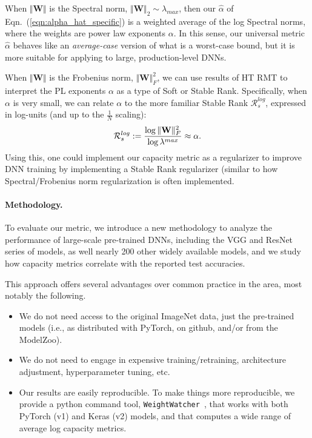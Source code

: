 When $\Vert\mathbf{W}\Vert$ is the Spectral norm, $\Vert\mathbf{W}\Vert_{2}\sim\lambda_{max}$, then our $\hat{\alpha}$ of Eqn.~(\ref{eqn:alpha_hat_specific}) is a weighted average of the log Spectral norms, where the weights are power law exponents $\alpha$. 
In this sense, our universal metric $\hat{\alpha}$ behaves like an \emph{average-case} version of what is a worst-case bound, but it is more suitable for applying to large, production-level DNNs.
 
When $\Vert\mathbf{W}\Vert$ is the Frobenius norm, $\Vert\mathbf{W}\Vert^{2}_{F}$, we can use results of HT RMT to interpret the PL exponents $\alpha$ as a type of Soft or Stable Rank. 
Specifically, when $\alpha$ is very small, we can relate $\alpha$ to the more familiar Stable Rank $\mathcal{R}^{log}_{s}$, expressed in log-units (and up to the $\frac{1}{N}$ scaling):
\vspace{-2mm}
\begin{equation}
\mathcal{R}^{log}_{s}:=\dfrac{\log\Vert\mathbf{W}\Vert^{2}_{F}}{\log\lambda^{max}}  \approx \alpha  .
\vspace{-1mm}
\end{equation}
Using this, one could implement our capacity metric as a regularizer to improve DNN training by implementing a Stable Rank regularizer (similar to how Spectral/Frobenius norm regularization is often implemented.  %


\vspace{-2mm}
\paragraph{Methodology.} 
To evaluate our metric, we introduce a new methodology to analyze the performance of large-scale pre-trained DNNs, including the VGG and ResNet series of models, as well nearly 200 other widely available models, and we study how capacity metrics correlate with the reported test accuracies.
 
This approach offers several advantages over common practice in the area, most notably the following.
\begin{itemize}
\item 
We do not need access to the original ImageNet data, just the pre-trained models (i.e., as distributed with PyTorch, on github, and/or from the ModelZoo).
\item
We do not need to engage in expensive training/retraining, architecture adjustment, hyperparameter tuning, etc.
\item 
Our results are easily reproducible.
To make things more reproducible, we provide a python command tool, \texttt{WeightWatcher}~\cite{weightwatcher_package_justURL}, that works with both PyTorch (v1) and Keras (v2) models, and that computes a wide range of average log capacity metrics.
\end{itemize}
 
